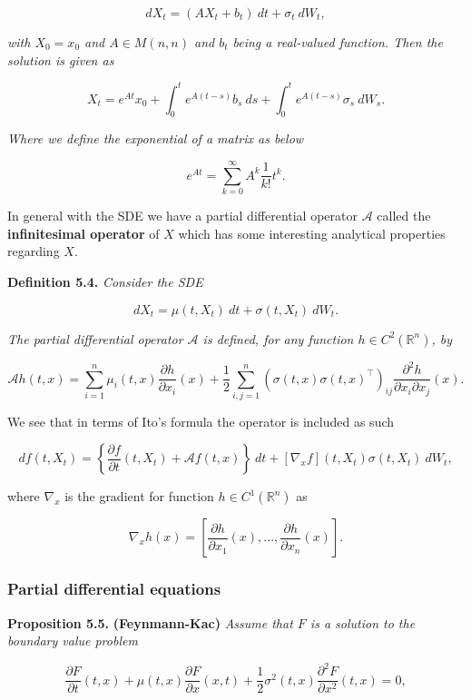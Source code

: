 \documentclass[
]{article}
\begin{document}
\[
dX_t=(A X_t + b_t)\ dt+ \sigma_t\ dW_t,\tag{5.19}
\]

\emph{with \(X_0=x_0\) and \(A\in M(n,n)\) and \(b_t\) being a
real-valued function. Then the solution is given as}

\[
X_t=e^{At}x_0+\int_0^te^{A(t-s)}b_s\ ds+\int_0^te^{A(t-s)}\sigma_s\ dW_s.\tag{5.20}
\]

\emph{Where we define the exponential of a matrix as below}

\[
e^{At}=\sum_{k=0}^\infty A^k\frac{1}{k!}t^k.
\]

In general with the SDE we have a partial differential operator
\(\mathcal{A}\) called the \textbf{infinitesimal operator} of \(X\)
which has some interesting analytical properties regarding \(X\).

\textbf{Definition 5.4.} \emph{Consider the SDE}

\[
dX_t=\mu(t,X_t)\ dt+\sigma(t,X_t)\ dW_t.\tag{5.21}
\]

\emph{The partial differential operator \(\mathcal{A}\) is defined, for
any function \(h\in C^2(\mathbb{R}^n)\), by}

\[
\mathcal{A}h(t,x)=\sum_{i=1}^n\mu_i(t,x)\frac{\partial h}{\partial x_i}(x) + \frac{1}{2}\sum_{i,j=1}^n (\sigma(t,x)\sigma(t,x)^\top)_{ij}\frac{\partial^2h}{\partial x_i\partial x_j}(x).
\]

We see that in terms of Ito's formula the operator is included as such

\[
df(t,X_t)=\left\{\frac{\partial f}{\partial t}(t,X_t)+\mathcal{A}f(t,x)\right\}\ dt+[\nabla_xf](t,X_t)\sigma(t,X_t)\ dW_t,
\]

where \(\nabla_x\) is the gradient for function
\(h\in C^1(\mathbb{R}^n)\) as

\[
\nabla_xh(x)=\left[\frac{\partial h}{\partial x_1}(x),...,\frac{\partial h}{\partial x_n}(x)\right].
\]

\hypertarget{partial-differential-equations}{%
\subsubsection{Partial differential
equations}\label{partial-differential-equations}}

\textbf{Proposition 5.5.} \textbf{(Feynmann-Kac)} \emph{Assume that
\(F\) is a solution to the boundary value problem}

\[
\frac{\partial F}{\partial t}(t,x)+\mu(t,x)\frac{\partial F}{\partial x}(x,t)+\frac{1}{2}\sigma^2(t,x)\frac{\partial^2 F}{\partial x^2}(t,x)=0,
\]
\end{document}
